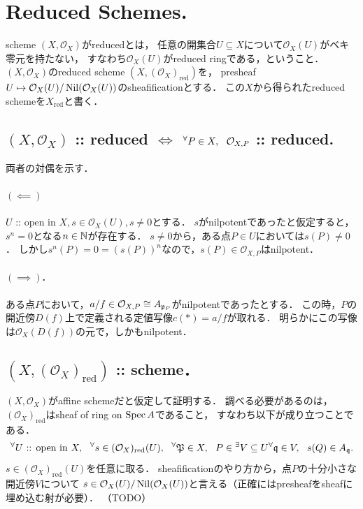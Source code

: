 \documentclass[a4paper]{jsarticle}
\newcommand{\shO}{\mathcal{O}}
\newcommand{\red}[1]{#1_{\text{red}}}
\newcommand{\OpenIn}{\text{ :: open in }}
\begin{document}
\section{Reduced Schemes.} %
    scheme $(X, \shO_X)$がreducedとは，
    任意の開集合$U \subseteq X$について$\shO_X(U)$がベキ零元を持たない，
    すなわち$\shO_X(U)$がreduced ringである，ということ．
    $(X, \shO_X)$のreduced scheme $(X, \red{(\shO_X)})$を，
    presheaf $U \mapsto \shO_X(U)/\Nil(\shO_X(U))$のsheafificationとする．
    この$X$から得られたreduced schemeを$\red{X}$と書く．

    \subsection{$(X, \shO_X)$ :: reduced $\iff$ $\Forall{P \in X} \shO_{X,P}$ :: reduced.}
    両者の対偶を示す．
    \paragraph{$(\impliedby)$}
    $U \OpenIn X, s \in \shO_X(U), s \neq 0$とする．
    $s$がnilpotentであったと仮定すると，$s^n=0$となる$n \in \mathbb{N}$が存在する．
    $s \neq 0$から，ある点$P \in U$においては$s(P) \neq 0$．
    しかし$s^n(P)=0=(s(P))^n$なので，$s(P) \in \shO_{X, P}$はnilpotent．

    \paragraph{$(\implies)$.}
    ある点$P$において，$a/f \in \shO_{X,P} \cong A_{\I{p}_P}$がnilpotentであったとする．
    この時，$P$の開近傍$D(f)$上で定義される定値写像$c(*)=a/f$が取れる．
    明らかにこの写像は$\shO_X(D(f))$の元で，しかもnilpotent．

    \subsection{$(X, \red{(\shO_X)})$ :: scheme．}
    $(X, \shO_X)$がaffine schemeだと仮定して証明する．
    調べる必要があるのは，$\red{(\shO_X)}$はsheaf of ring on $\operatorname{Spec} A$であること，
    すなわち以下が成り立つことである．
    \[
        \Forall{U \OpenIn X} \Forall{s \in \red{(\shO_X)}(U)}
        \Forall{\I{P} \in X} P \in {}^{\exists} V \subseteq U \Forall{\I{q} \in V}
        s(Q) \in A_{\I{q}}.
    \]
    $s \in \red{(\shO_X)}(U)$を任意に取る．
    sheafificationのやり方から，点$P$の十分小さな開近傍$V$について
    $s \in \shO_X(U)/\Nil(\shO_X(U))$と言える（正確にはpresheafをsheafに埋め込む射が必要）．
    （TODO）
\end{document}
